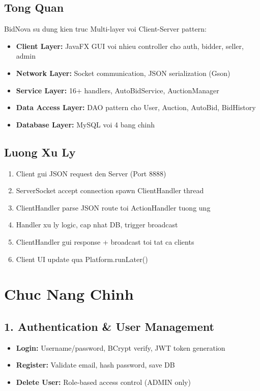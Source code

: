 ﻿\documentclass[12pt, a4paper]{report}
\begin{document}
\section{Tong Quan}
BidNova su dung kien truc Multi-layer voi Client-Server pattern:
\begin{itemize}
    \item \textbf{Client Layer:} JavaFX GUI voi nhieu controller cho auth, bidder, seller, admin
    \item \textbf{Network Layer:} Socket communication, JSON serialization (Gson)
    \item \textbf{Service Layer:} 16+ handlers, AutoBidService, AuctionManager
    \item \textbf{Data Access Layer:} DAO pattern cho User, Auction, AutoBid, BidHistory
    \item \textbf{Database Layer:} MySQL voi 4 bang chinh
\end{itemize}

\section{Luong Xu Ly}
\begin{enumerate}
    \item Client gui JSON request den Server (Port 8888)
    \item ServerSocket accept connection spawn ClientHandler thread
    \item ClientHandler parse JSON route toi ActionHandler tuong ung
    \item Handler xu ly logic, cap nhat DB, trigger broadcast
    \item ClientHandler gui response + broadcast toi tat ca clients
    \item Client UI update qua Platform.runLater()
\end{enumerate}

\newpage

\chapter{Chuc Nang Chinh}

\section{1. Authentication \& User Management}
\begin{itemize}
    \item \textbf{Login:} Username/password, BCrypt verify, JWT token generation
    \item \textbf{Register:} Validate email, hash password, save DB
    \item \textbf{Delete User:} Role-based access control (ADMIN only)
\end{itemize}
\end{document}
